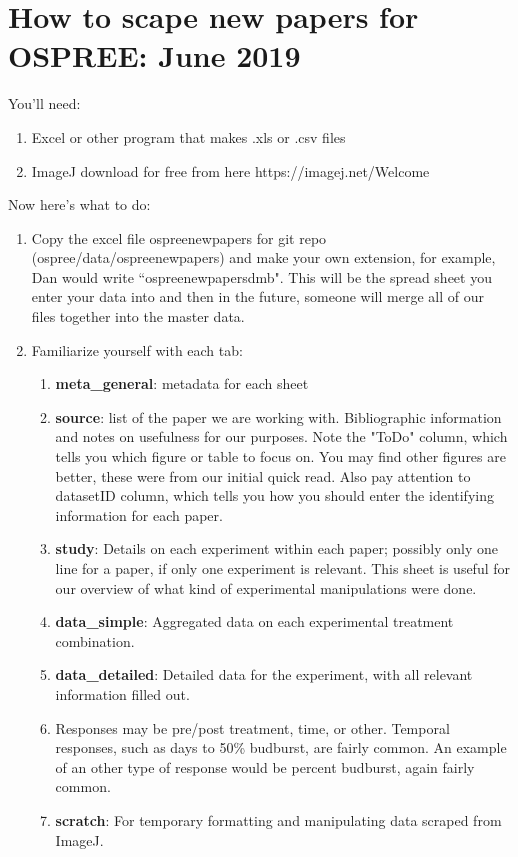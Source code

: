 \documentclass{article}\usepackage[]{graphicx}\usepackage[]{color}
\begin{document}
\section*{How to scape new papers for OSPREE: June 2019}
You'll need:
\begin{enumerate}
\item Excel or other program that makes .xls  or .csv files
\item ImageJ download for free from here https://imagej.net/Welcome
\end{enumerate}

Now here's what to do:
\begin{enumerate}
\item Copy the excel file ospree\textunderscore newpapers for git repo (ospree/data/ospree\textunderscore newpapers) and make your own extension, for example, Dan would write ``ospree\textunderscore newpapers\textunderscore dmb". This will be the spread sheet you enter your data into and then in the future, someone will merge all of our files together into the master data.
\item Familiarize yourself with each tab:
  \begin{enumerate}
  \item \textbf{meta\_general}: metadata for each sheet
  \item \textbf{source}: list of the paper we are working with. Bibliographic information and notes on usefulness for our purposes. Note the "ToDo" column, which tells you which figure or table to focus on. You may find other figures are better, these were from our initial quick read. Also pay attention to datasetID column, which tells you how you should enter the identifying information for each paper.
  \item \textbf{study}: Details on each experiment within each paper; possibly only one line for a paper, if only one experiment is relevant. This sheet is useful for our overview of what kind of experimental manipulations were done.
  \item \textbf{data\_simple}: Aggregated data on each experimental treatment combination.
  \item \textbf{data\_detailed}: Detailed data for the experiment, with all relevant information filled out.
  \item Responses may be pre/post treatment, time, or other. Temporal responses, such as days to 50\% budburst, are fairly common. An example of an other type of response would be percent budburst, again fairly common.
  \item \textbf{scratch}: For temporary formatting and manipulating data scraped from ImageJ.

\end{enumerate}
\end{enumerate}
\end{document}
